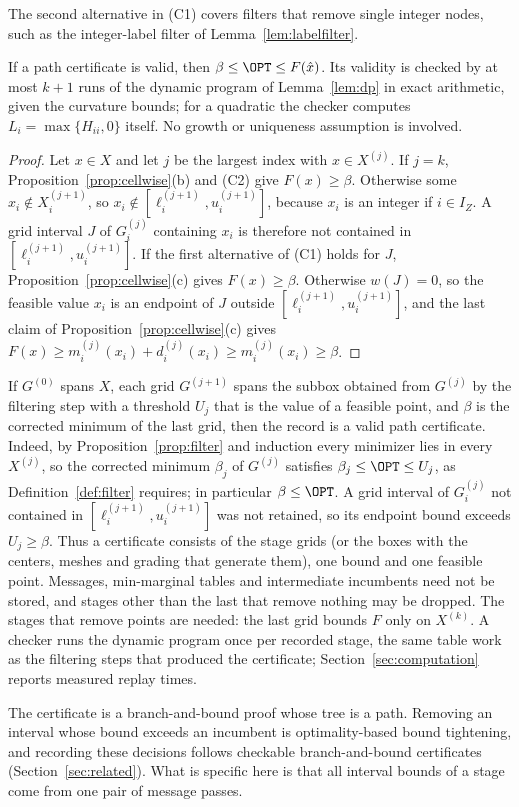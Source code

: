 The second alternative in (C1) covers filters that remove single integer
nodes, such as the integer-label filter of Lemma~\ref{lem:labelfilter}.

\begin{theorem}\label{thm:certificate}
If a path certificate is valid, then $\beta\le\OPT\le F(\hat x)$. Its
validity is checked by at most $k+1$ runs of the dynamic program of
Lemma~\ref{lem:dp} in exact arithmetic, given the curvature bounds; for a
quadratic the checker computes $L_i=\max\{H_{ii},0\}$ itself. No growth or
uniqueness assumption is involved.
\end{theorem}

\begin{proof}
Let $x\in X$ and let $j$ be the largest index with $x\in X^{(j)}$. If $j=k$,
Proposition~\ref{prop:cellwise}(b) and (C2) give $F(x)\ge\beta$. Otherwise
some $x_i\notin X^{(j+1)}_i$, so $x_i\notin[\ell_i^{(j+1)},u_i^{(j+1)}]$,
because $x_i$ is an integer if $i\in I_Z$. A grid interval $J$ of $G_i^{(j)}$
containing $x_i$ is therefore not contained in
$[\ell_i^{(j+1)},u_i^{(j+1)}]$. If the first alternative of (C1) holds for
$J$, Proposition~\ref{prop:cellwise}(c) gives $F(x)\ge\beta$. Otherwise
$w(J)=0$, so the feasible value $x_i$ is an endpoint of $J$ outside
$[\ell_i^{(j+1)},u_i^{(j+1)}]$, and the last claim of
Proposition~\ref{prop:cellwise}(c) gives
$F(x)\ge m^{(j)}_i(x_i)+d^{(j)}_i(x_i)\ge m^{(j)}_i(x_i)\ge\beta$.
\end{proof}

If $G^{(0)}$ spans $X$, each grid $G^{(j+1)}$ spans the subbox obtained from
$G^{(j)}$ by the filtering step with a threshold $U_j$ that is the value of a feasible point,
and $\beta$ is the corrected minimum of the last grid, then the record is a
valid path certificate. Indeed, by Proposition~\ref{prop:filter} and
induction every minimizer lies in every $X^{(j)}$, so the corrected minimum
$\beta_j$ of $G^{(j)}$ satisfies $\beta_j\le\OPT\le U_j$, as
Definition~\ref{def:filter} requires; in particular $\beta\le\OPT$. A grid
interval of $G_i^{(j)}$ not contained in $[\ell_i^{(j+1)},u_i^{(j+1)}]$ was
not retained, so its endpoint bound exceeds $U_j\ge\beta$. Thus a certificate
consists of the stage grids (or the boxes with the centers, meshes and
grading that generate them), one bound and one feasible point. Messages,
min-marginal tables and intermediate incumbents need not be stored, and stages
other than the last that remove nothing may be dropped. The stages that remove
points are needed: the last grid bounds $F$ only on $X^{(k)}$. A checker runs
the dynamic program once per recorded stage, the same table work as the
filtering steps that produced the certificate;
Section~\ref{sec:computation} reports measured replay times.

The certificate is a branch-and-bound proof whose tree is a path. Removing an
interval whose bound exceeds an incumbent is optimality-based bound
tightening, and recording these decisions follows checkable branch-and-bound
certificates (Section~\ref{sec:related}). What is specific here is that all
interval bounds of a stage come from one pair of message passes.
